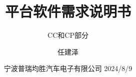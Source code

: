 
\title{平台软件需求说明书\XeLaTeX}
\subtitle{CC和CP部分 }
\author{任建泽}
\date{宁波普瑞均胜汽车电子有限公司 2024/8/9}









\maketitle
\frontmatter
\tableofcontents
 \mainmatter

\clearpage
{} %
\setcounter{page}{1} %

